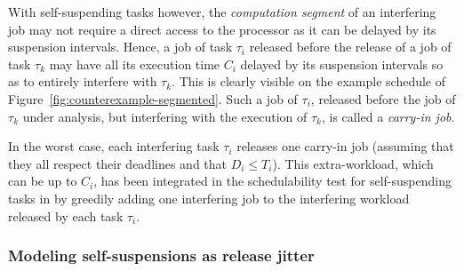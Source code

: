 With self-suspending tasks however, the \emph{computation segment} of an interfering job may not require a direct access to the processor as it can be delayed by its suspension intervals. Hence, a job of task $\tau_i$ released before the release of a job of task $\tau_k$ may have all its execution time $C_i$ delayed by its suspension intervals so as to entirely interfere with $\tau_k$. 
This is clearly visible on the example schedule of Figure~\ref{fig:counterexample-segmented}.
Such a job of $\tau_i$, released before the job of $\tau_k$ under analysis, but interfering with the execution of $\tau_k$, is called a \emph{carry-in job}.

In the worst case, each interfering task $\tau_i$ releases one carry-in job (assuming that they all respect their deadlines and that $D_i \leq T_i$). This extra-workload, which can be up to $C_i$, has been integrated in the schedulability test for self-suspending tasks in \cite{huangpass:dac2015,LiuChen:rtss2014} by greedily adding one interfering job to the interfering workload released by each task $\tau_i$.




\subsubsection{Modeling self-suspensions as release jitter}
\label{sec:model-interfering-jitter}

